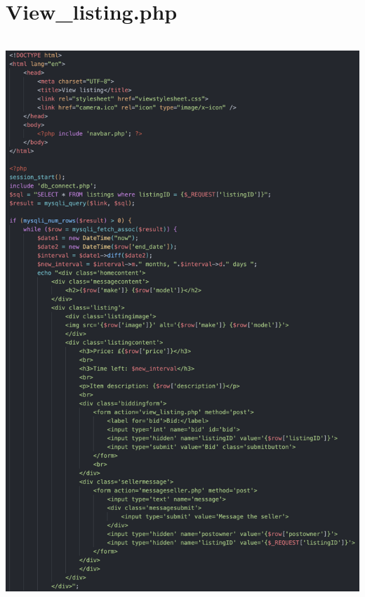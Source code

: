 \section*{View\_listing.php}\includegraphics[width=5.48267in,height=8.37708in]{ch6_appendix/media/image18.png}

